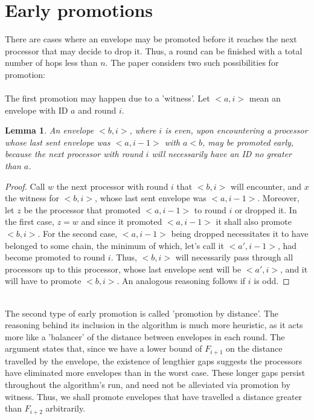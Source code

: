 \documentclass{article}
\newtheorem{lemma}{Lemma}
\begin{document}
\section{Early promotions}
There are cases where an envelope may be promoted before it reaches the next processor that may decide to drop it. Thus, a round can be finished with a total number of hops less than $n$. The paper considers two such possibilities for promotion:
\\\\
The first promotion may happen due to a 'witness'. Let $<a, i>$ mean an envelope with ID $a$ and round $i$.
\begin{lemma} 
    An envelope $<b, i>$, where $i$ is even, upon encountering a processor whose last sent envelope was $<a, i-1>$ with $a < b$, may be promoted early, because the next processor with round $i$ will necessarily have an ID no greater than $a$.
\end{lemma}
\begin{proof}
Call $w$ the next processor with round $i$ that $<b, i>$ will encounter, and $x$ the witness for $<b, i>$, whose last sent envelope was $<a, i-1>$. Moreover, let $z$ be the processor that promoted $<a, i-1>$ to round $i$ or dropped it. In the first case, $z = w$ and since it promoted $<a, i-1>$ it shall also promote $<b, i>$. For the second case, $<a, i-1>$ being dropped necessitates it to have belonged to some chain, the minimum of which, let's call it $<a', i-1>$, had become promoted to round $i$. Thus, $<b, i>$ will necessarily pass through all processors up to this processor, whose last envelope sent will be $<a', i>$, and it will have to promote $<b, i>$. An analogous reasoning follows if $i$ is odd.
\end{proof}
\leavevmode
\\
The second type of early promotion is called 'promotion by distance'. The reasoning behind its inclusion in the algorithm is much more heuristic, as it acts more like a 'balancer' of the distance between envelopes in each round. The argument states that, since we have a lower bound of $F_{i+1}$ on the distance travelled by the envelope, the existence of lengthier gaps suggests the processors have eliminated more envelopes than in the worst case. These longer gaps persist throughout the algorithm's run, and need not be alleviated via promotion by witness. Thus, we shall promote envelopes that have travelled a distance greater than $F_{i+2}$ arbitrarily.
\\\\
\newpage
\end{document}

